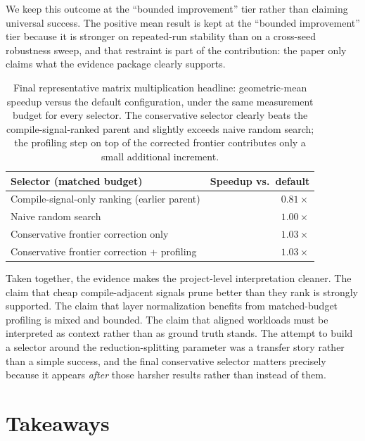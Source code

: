 \documentclass[10pt,twocolumn]{article}
\begin{document}
We keep this outcome at the ``bounded improvement'' tier rather than claiming universal success. The positive mean result is kept at the ``bounded improvement'' tier because it is stronger on repeated-run stability than on a cross-seed robustness sweep, and that restraint is part of the contribution: the paper only claims what the evidence package clearly supports.

\begin{table}[t]
\centering
\small
\begin{tabular}{p{}r}
\toprule
Selector (matched budget) & Speedup vs.\ default \\
\midrule
Compile-signal-only ranking (earlier parent) & $0.81\times$ \\
Naive random search & $1.00\times$ \\
Conservative frontier correction only & $1.03\times$ \\
Conservative frontier correction + profiling & $1.03\times$ \\
\bottomrule
\end{tabular}
\caption{Final representative matrix multiplication headline: geometric-mean speedup versus the default configuration, under the same measurement budget for every selector. The conservative selector clearly beats the compile-signal-ranked parent and slightly exceeds naive random search; the profiling step on top of the corrected frontier contributes only a small additional increment.}
\label{tab:condensed-headline}
\end{table}

Taken together, the evidence makes the project-level interpretation cleaner. The claim that cheap compile-adjacent signals prune better than they rank is strongly supported. The claim that layer normalization benefits from matched-budget profiling is mixed and bounded. The claim that aligned workloads must be interpreted as context rather than as ground truth stands. The attempt to build a selector around the reduction-splitting parameter was a transfer story rather than a simple success, and the final conservative selector matters precisely because it appears \emph{after} those harsher results rather than instead of them.

\section{Takeaways}
\end{document}
